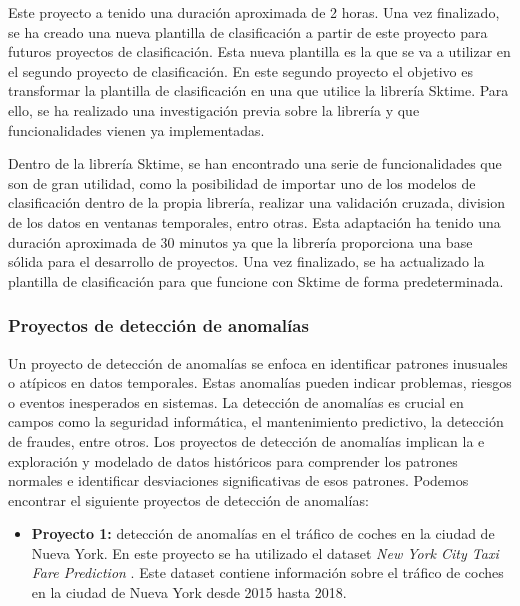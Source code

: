 Este proyecto a tenido una duración aproximada de 2 horas. Una vez finalizado, se ha creado una nueva
plantilla de clasificación a partir de este proyecto para futuros proyectos de clasificación. Esta nueva
plantilla es la que se va a utilizar en el segundo proyecto de clasificación. En este segundo proyecto
el objetivo es transformar la plantilla de clasificación en una que utilice la librería Sktime. Para ello,
se ha realizado una investigación previa sobre la librería y que funcionalidades vienen ya implementadas.\medskip

Dentro de la librería Sktime, se han encontrado una serie de funcionalidades que son de gran utilidad,
como la posibilidad de importar uno de los modelos de clasificación dentro de la propia librería, realizar
una validación cruzada, division de los datos en ventanas temporales, entro otras. Esta adaptación ha
tenido una duración aproximada de 30 minutos ya que la librería proporciona una base sólida para el desarrollo
de proyectos. Una vez finalizado, se ha actualizado la plantilla de clasificación para que funcione con 
Sktime de forma predeterminada.

\subsubsection{Proyectos de detección de anomalías}
Un proyecto de detección de anomalías se enfoca en identificar patrones inusuales o 
atípicos en datos temporales. Estas anomalías pueden indicar problemas, riesgos o 
eventos inesperados en sistemas. La detección de anomalías 
es crucial en campos como la seguridad informática, el mantenimiento predictivo, la 
detección de fraudes, entre otros. Los proyectos de detección de anomalías implican la e
exploración y modelado de datos históricos para comprender los patrones normales e identificar 
desviaciones significativas de esos patrones. Podemos encontrar el siguiente proyectos de detección de anomalías:

\begin{itemize}
    \item \textbf{Proyecto 1:} detección de anomalías en el tráfico de coches en la ciudad de Nueva York.
    En este proyecto se ha utilizado el dataset \textit{New York City Taxi Fare Prediction} \cite{Traffic_NY}.
    Este dataset contiene información sobre el tráfico de coches en la ciudad de Nueva York desde 2015
    hasta 2018.
\end{itemize}

